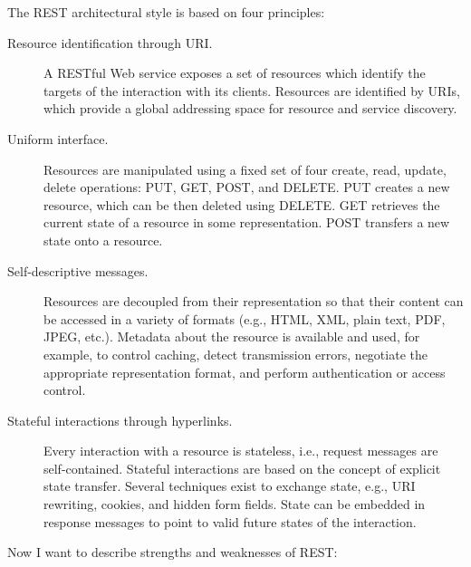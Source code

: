 \documentclass[thesis=B,english]{FITthesis}[2012/10/20]
\begin{document}
The REST architectural style is based on four principles:
	\begin{description}
		\item[Resource identification through URI.] A RESTful Web service exposes a set of resources which identify the targets of the interaction with its clients. Resources are identified by URIs, which provide a global addressing space for resource and service discovery. 			
		\item[Uniform interface.] Resources are manipulated using a fixed set of four create, read, update, delete operations: PUT, GET, POST, and DELETE. PUT creates a new resource, which can be then deleted using DELETE. GET retrieves the current state of a resource in some representation. POST transfers a new state onto a resource.\cite{soaprest}
		\item[Self-descriptive messages.] Resources are decoupled from their representation so that their content can be accessed in a variety of formats (e.g., HTML, XML, plain text, PDF, JPEG, etc.). Metadata about the resource is available and used, for example, to control caching, detect transmission errors, negotiate the appropriate representation format, and perform authentication or access control. 
		\item[Stateful interactions through hyperlinks.] Every interaction with a resource is stateless, i.e., request messages are self-contained. Stateful interactions are based on the concept of explicit state transfer. Several techniques exist to exchange state, e.g., URI rewriting, cookies, and hidden form fields. State can be embedded in response messages to point to valid future states of the interaction.\cite{soaprest}
	\end{description}
Now I want to describe strengths and weaknesses of REST:
\end{document}
